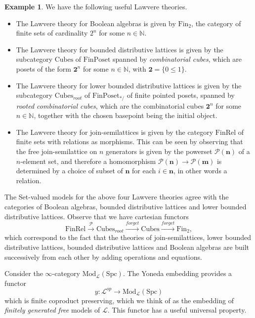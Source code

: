 \documentclass[10pt]{amsart}
\theoremstyle{definition}
\newtheorem{example}[theorem]{Example}
\begin{document}
\begin{example}
We have the following useful Lawvere theories.
\begin{itemize}
\item The Lawvere theory for Boolean algebras is given by $\mathrm{Fin}_2$, the category of finite sets of cardinality $2^n$ for some $n \in \mathbb{N}$.
\item The Lawvere theory for bounded distributive lattices is given by the subcategory $\mathrm{Cubes}$ of $\mathrm{FinPoset}$ spanned by \emph{combinatorial cubes}, which are posets of the form $\mathbf{2}^n$ for some $n \in \mathbb{N}$, with $\mathbf{2} = \{0 \leq 1\}$.
\item The Lawvere theory for lower bounded distributive lattices is given by the subcategory $\mathrm{Cubes}_{root}$ of $\mathrm{FinPoset}_{*/}$ of finite pointed posets, spanned by \emph{rooted combinatorial cubes}, which are the combinatorial cubes $\mathbf{2}^n$ for some $n \in \mathbb{N}$, together with the chosen basepoint being the initial object.
\item The Lawvere theory for join-semilattices is given by the category $\mathrm{FinRel}$ of finite sets with relations as morphisms. This can be seen by observing that the free join-semilattice on $n$ generators is given by the powerset $\mathcal{P}(\mathbf{n})$ of a $n$-element set, and therefore a homomorphism  $\mathcal{P}(\mathbf{n}) \rightarrow \mathcal{P}(\mathbf{m})$ is determined by a choice of subset of $\mathbf{n}$ for each $i \in \mathbf{n}$, in other words a relation.
\end{itemize}
The Set-valued models for the above four Lawvere theories agree with the categories of Boolean algebras, bounded distributive lattices and lower bounded distributive lattices. Observe that we have cartesian functors
$$\mathrm{FinRel} \xrightarrow{\mathcal{P}} \mathrm{Cubes}_{root} \xrightarrow{forget} \mathrm{Cubes} \xrightarrow{forget} \mathrm{Fin}_2,$$
which correspond to the fact that the theories of join-semilattices, lower bounded distributive lattices, bounded distributive lattices and Boolean algebras are built successively from each other by adding operations and equations.
\end{example}






Consider the $\infty$-category $\text{Mod}_\mathcal{L}(\mathrm{Spc})$. The Yoneda embedding provides a functor
$$y : \mathcal{L}^{op} \rightarrow \text{Mod}_\mathcal{L}(\mathrm{Spc})$$
which is finite coproduct preserving, which we think of as the embedding of \emph{finitely generated free} models of $\mathcal{L}$. This functor has a useful universal property.
\end{document}
